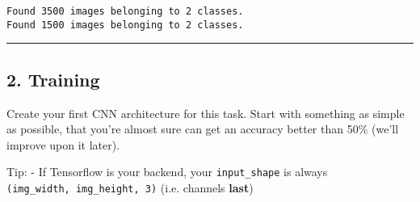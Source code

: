 \documentclass[11pt]{article}
\begin{document}
    \begin{Verbatim}[commandchars=\\\{\}]
Found 3500 images belonging to 2 classes.
Found 1500 images belonging to 2 classes.

    \end{Verbatim}

    \begin{center}\rule{0.5\linewidth}{\linethickness}\end{center}

\subsection{2. Training}\label{training}

    Create your first CNN architecture for this task. Start with something
as simple as possible, that you're almost sure can get an accuracy
better than 50\% (we'll improve upon it later).

Tip: - If Tensorflow is your backend, your \texttt{input\_shape} is
always \texttt{(img\_width,\ img\_height,\ 3)} (i.e. channels
\textbf{last})
\end{document}
